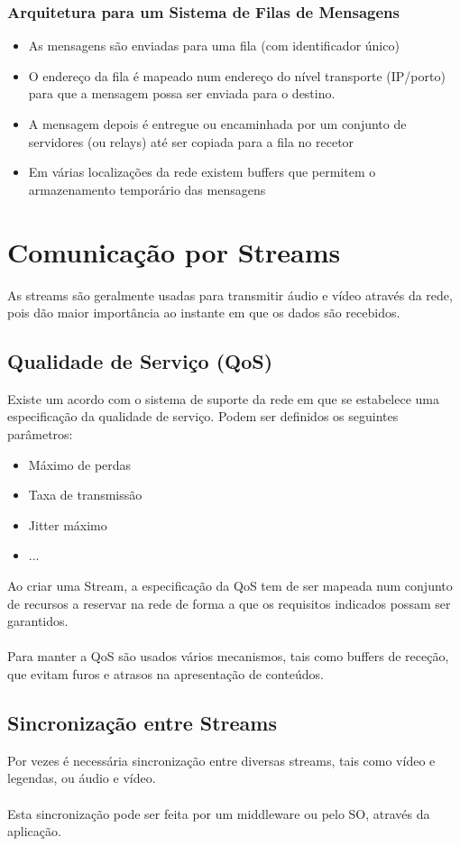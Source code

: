 \documentclass[10pt,a4paper]{report}
\begin{document}
\subsubsection{Arquitetura para um Sistema de Filas de Mensagens}
\begin{itemize}
\item As mensagens são enviadas para uma fila (com identificador único)
\item O endereço da fila é mapeado num endereço do nível transporte (IP/porto) para que a mensagem possa ser enviada para o destino.
\item A mensagem depois é entregue ou encaminhada por um conjunto de servidores (ou relays) até ser copiada para a fila no recetor
\item Em várias localizações da rede existem buffers que permitem o armazenamento temporário das mensagens
\end{itemize}
\section{Comunicação por Streams}
As streams são geralmente usadas para transmitir áudio e vídeo através da rede, pois dão maior importância ao instante em que os dados são recebidos.
\subsection{Qualidade de Serviço (QoS)}
Existe um acordo com o sistema de suporte da rede em que se estabelece uma especificação da qualidade de serviço. Podem ser definidos os seguintes parâmetros:
\begin{itemize}
\item Máximo de perdas
\item Taxa de transmissão
\item Jitter máximo
\item ...
\end{itemize}
Ao criar uma Stream, a especificação da QoS tem de ser mapeada num conjunto de recursos a reservar na rede de forma a que os requisitos indicados possam ser garantidos.\\
\\
Para manter a QoS são usados vários mecanismos, tais como buffers de receção, que evitam furos e atrasos na apresentação de conteúdos.
\subsection{Sincronização entre Streams}
Por vezes é necessária sincronização entre diversas streams, tais como vídeo e legendas, ou áudio e vídeo.\\
\\
Esta sincronização pode ser feita por um middleware ou pelo SO, através da aplicação.
\end{document}

